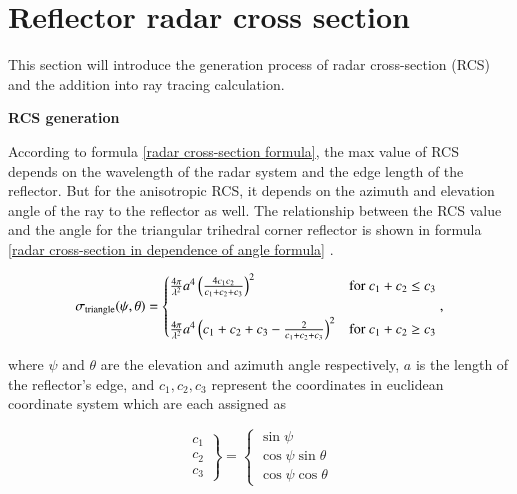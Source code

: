 \documentclass[12pt,DIV14,BCOR12mm,a4paper,footinclude=false,headinclude,parskip=half-,twoside,openright,cleardoublepage=empty,toc=index,bibliography=totoc,listof=totoc]{scrreprt}
\numberwithin{equation}{chapter}
\begin{document}
\section{Reflector radar cross section} \label{Reflector radar cross section}
This section will introduce the generation process of radar cross-section (RCS) and the addition into ray tracing calculation.

\begin{spacing}{1.5}
\textbf{\large{RCS generation}}
\end{spacing}

According to formula \ref{radar cross-section formula}, the max value of RCS depends on the wavelength of the radar system and the edge length of the reflector. But for the anisotropic RCS, it depends on the azimuth and elevation angle of the ray to the reflector as well. The relationship between the RCS value and the angle for the triangular trihedral corner reflector is shown in formula \ref{radar cross-section in dependence of angle formula} \cite{doerry_reflectors_2014}.

\begin{equation}
    \centering
    \sigma_{\text{triangle}}(\psi, \theta) =
    \begin{cases} 
    \frac{4\pi}{\lambda^2}a^4\left(\frac{4c_1c_2}{c_1 + c_2 + c_3}\right)^2 & \text{for } c_1 + c_2 \leq c_3 \\ \\
    \frac{4\pi}{\lambda^2}a^4\left(c_1 + c_2 + c_3 - \frac{2}{c_1 + c_2 + c_3}\right)^2 & \text{for } c_1 + c_2 \geq c_3
    \end{cases},
    \label{radar cross-section in dependence of angle formula}
\end{equation}

where $\psi$ and $\theta$ are the elevation and azimuth angle respectively, $a$ is the length of the reflector's edge, and $c_1, c_2, c_3$ represent the coordinates in euclidean coordinate system which are each assigned as

\begin{equation}
    \left.
    \begin{array}{l}
    c_1 \\
    c_2 \\
    c_3
    \end{array}
    \right\}
    =
    \left\{
    \begin{array}{l}
    \sin \psi \\
    \cos \psi \sin \theta \\
    \cos \psi \cos \theta
    \end{array}
    \right.
\end{equation}
\end{document}
